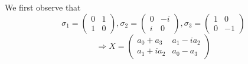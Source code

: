 \item

We first observe that
\[
	\sigma_1 = \begin{pmatrix} 0 &  1 \\ 1 &  0\end{pmatrix},
	\sigma_2 = \begin{pmatrix} 0 & -i \\ i &  0\end{pmatrix},
	\sigma_3 = \begin{pmatrix} 1 &  0 \\ 0 & -1\end{pmatrix}
\]
\[
	\Rightarrow X = \begin{pmatrix}
		a_0 +  a_3 & a_1 - ia_2 \\
		a_1 + ia_2 & a_0 - a_3
	\end{pmatrix}
\]

